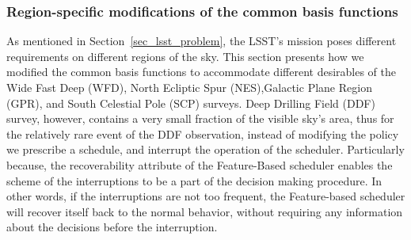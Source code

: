 \documentclass[11pt]{article}
\theoremstyle{definition}
\begin{document}
\subsubsection{Region-specific modifications of the common basis functions}
As mentioned in Section~\ref{sec_lsst_problem}, the LSST's mission poses different requirements on different regions of the sky. This section presents how we modified the common basis functions to accommodate different desirables of the Wide Fast Deep (WFD), North Ecliptic Spur (NES),Galactic Plane Region (GPR), and South Celestial Pole (SCP)  surveys. Deep Drilling Field (DDF) survey, however, contains a very small fraction of the visible sky's area, thus for the relatively rare event of the DDF observation, instead of modifying the policy we prescribe a schedule, and interrupt the operation of the scheduler. Particularly because, the recoverability attribute of the Feature-Based scheduler enables the scheme of the interruptions to be a part of the decision making procedure. In other words, if the interruptions are not too frequent, the Feature-based scheduler will recover itself back to the normal behavior, without requiring any information about the decisions before the interruption. \\
\end{document}
